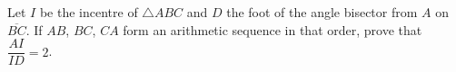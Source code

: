 Let $I$ be the incentre of $\triangle ABC$ and $D$ the foot of the angle bisector from $A$ on $\overline{BC}$. If $AB$, $BC$, $CA$ form an arithmetic sequence in that order, prove that $\dfrac{AI}{ID}=2$.
